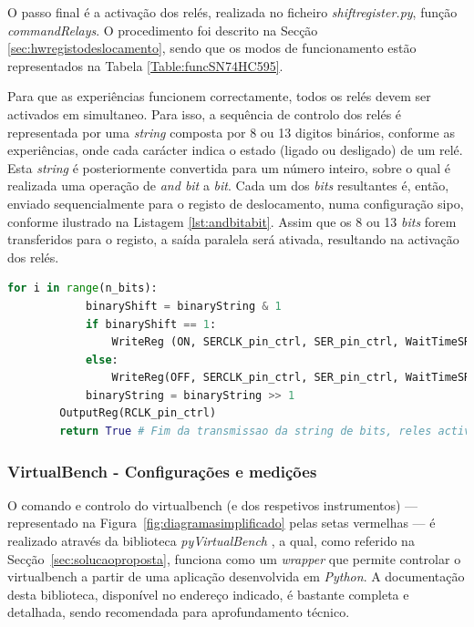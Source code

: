 O passo final é a activação dos relés, realizada no ficheiro \textit{shift\textunderscore register.py}, função \textit{commandRelays}. O procedimento foi descrito na Secção \ref{sec:hwregistodeslocamento}, sendo que os modos de funcionamento estão representados na Tabela \ref{Table:funcSN74HC595}.

Para que as experiências funcionem correctamente, todos os relés devem ser activados em simultaneo. Para isso, a sequência de controlo dos relés é representada por uma \textit{string} composta por 8 ou 13 digitos binários, conforme as experiências, onde cada carácter indica o estado (ligado ou desligado) de um relé. Esta \textit{string} é posteriormente convertida para um número inteiro, sobre o qual é realizada uma operação de \textit{and bit} a \textit{bit}. Cada um dos \textit{bits} resultantes é, então, enviado sequencialmente para o registo de deslocamento, numa configuração \acrshort{sipo}, conforme ilustrado na Listagem \ref{lst:andbitabit}. Assim que os 8 ou 13 \textit{bits} forem transferidos para o registo, a saída paralela será ativada, resultando na activação dos relés.

\begin{minipage}{0.9\linewidth}
	\begin{lstlisting}[language=Python,escapechar=|, caption=\textit{And bit} \textit{bit shift\textunderscore register.py}, label=lst:andbitabit]
		for i in range(n_bits):
			binaryShift = binaryString & 1
			if binaryShift == 1:
				WriteReg (ON, SERCLK_pin_ctrl, SER_pin_ctrl, WaitTimeSR)
			else:
				WriteReg(OFF, SERCLK_pin_ctrl, SER_pin_ctrl, WaitTimeSR)
			binaryString = binaryString >> 1
		OutputReg(RCLK_pin_ctrl)
		return True # Fim da transmissao da string de bits, reles activados
	\end{lstlisting}
\end{minipage}

\subsubsection{VirtualBench - Configurações e medições}
\label{sec:configmedicaoes}
O comando e controlo do \acrshort{virtualbench} (e dos respetivos instrumentos) — representado na Figura~\ref{fig:diagramasimplificado} pelas setas vermelhas — é realizado através da biblioteca \textit{pyVirtualBench} \cite{docpyvirtualbench}, a qual, como referido na Secção~\ref{sec:solucaoproposta}, funciona como um \textit{wrapper} que permite controlar o \acrshort{virtualbench} a partir de uma aplicação desenvolvida em \textit{Python}. A documentação desta biblioteca, disponível no endereço indicado, é bastante completa e detalhada, sendo recomendada para aprofundamento técnico.

